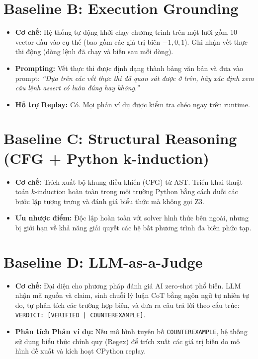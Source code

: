 \section{Baseline B: Execution Grounding}
\begin{itemize}
    \item \textbf{Cơ chế:} Hệ thống tự động khởi chạy chương trình trên một lưới gồm 10 vector đầu vào cụ thể (bao gồm các giá trị biên $-1, 0, 1$). Ghi nhận vết thực thi động (dòng lệnh đã chạy và biến sau mỗi dòng).
    \item \textbf{Prompting:} Vết thực thi được định dạng thành bảng văn bản và đưa vào prompt: \textit{``Dựa trên các vết thực thi đã quan sát được ở trên, hãy xác định xem câu lệnh assert có luôn đúng hay không.''}
    \item \textbf{Hỗ trợ Replay:} Có. Mọi phản ví dụ được kiểm tra chéo ngay trên runtime.

\end{itemize}

\section{Baseline C: Structural Reasoning (CFG + Python k-induction)}
\begin{itemize}
    \item \textbf{Cơ chế:} Trích xuất bộ khung điều khiển (CFG) từ AST. Triển khai thuật toán $k$-induction hoàn toàn trong môi trường Python bằng cách duỗi các bước lặp tượng trưng và đánh giá biểu thức mà không gọi Z3.
    \item \textbf{Ưu nhược điểm:} Độc lập hoàn toàn với solver hình thức bên ngoài, nhưng bị giới hạn về khả năng giải quyết các hệ bất phương trình đa biến phức tạp.
\end{itemize}

\section{Baseline D: LLM-as-a-Judge}
\begin{itemize}
    \item \textbf{Cơ chế:} Đại diện cho phương pháp đánh giá AI zero-shot phổ biến. LLM nhận mã nguồn và claim, sinh chuỗi lý luận CoT bằng ngôn ngữ tự nhiên tự do, tự phân tích các trường hợp biên, và đưa ra câu trả lời theo cấu trúc: \texttt{VERDICT: [VERIFIED | COUNTEREXAMPLE]}.
    \item \textbf{Phân tích Phản ví dụ:} Nếu mô hình tuyên bố \texttt{COUNTEREXAMPLE}, hệ thống sử dụng biểu thức chính quy (Regex) để trích xuất các giá trị biến do mô hình đề xuất và kích hoạt CPython replay.
\end{itemize}

